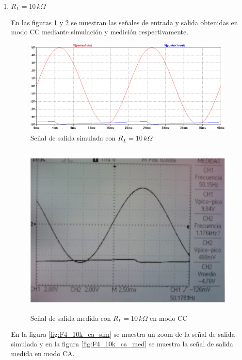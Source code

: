 \documentclass[10pt,spanish,a4paper,openany,notitlepage]{article}
\begin{document}
\begin{enumerate}
    \item $R_L = 10\,\unit{k\Omega}$
    
    En las figuras \ref{fig:F4_10k_cc_sim} y \ref{fig:F4_10k_cc_med} se muestran las señales de entrada
    y salida obtenidas en modo CC mediante simulación y medición respectivamente. 

    \begin{figure}[H]
    \centering
    \includegraphics[scale=0.65]{simulaciones/F4_vo_RL-10k.png}
    \caption{Señal de salida simulada con $R_L = 10\,\unit{k\Omega}$}
    \label{fig:F4_10k_cc_sim}
    \end{figure}
    
    \begin{figure}[H]
    \centering
    \includegraphics[width=350pt, height=250pt]{mediciones/F4-10K.jpg}
    \caption{Señal de salida medida con $R_L = 10\,\unit{k\Omega}$ en modo CC}
    \label{fig:F4_10k_cc_med}
    \end{figure}
    
    En la figura \ref{fig:F4_10k_ca_sim} se muestra un zoom de la señal de salida simulada y en
    la figura \ref{fig:F4_10k_ca_med} se muestra la señal de salida medida en modo CA.


\end{enumerate}
\end{document}
